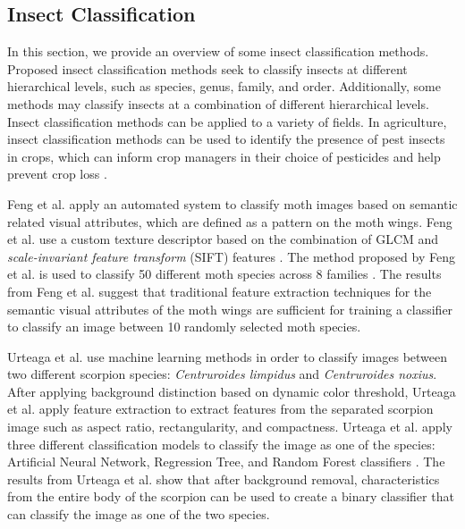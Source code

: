 \documentclass{aci}
\numberwithin{equation}{section}
\begin{document}
\subsection{Insect Classification}
In this section, we provide an overview of some insect classification methods.
Proposed insect classification methods seek to classify insects at different
hierarchical levels, such as species, genus, family, and order. Additionally,
some methods may classify insects at a combination of different hierarchical
levels. Insect classification methods can be applied to a variety of fields. In
agriculture, insect classification methods can be used to identify the presence
of pest insects in crops, which can inform crop managers in their choice of
pesticides and help prevent crop loss \cite{liu_pestnet_2019,
    kasinathan_machine_2021}.

Feng et al. \cite{feng_automated_2013} apply an automated system to classify
moth images based on semantic related visual attributes, which are defined as a
pattern on the moth wings. Feng et al. \cite{feng_automated_2013} use a custom
texture descriptor based on the combination of GLCM and \textit{scale-invariant
    feature transform} (SIFT) features \cite{gotlieb_texture_1990,
    lowe_distinctive_2004}. The method proposed by Feng et al.
\cite{feng_automated_2013} is used to classify 50 different moth species across
8 families \cite{feng_automated_2013}. The results from Feng et al.
\cite{feng_automated_2013} suggest that traditional feature extraction
techniques for the semantic visual attributes of the moth wings are sufficient
for training a classifier to classify an image between 10 randomly selected moth
species.

Urteaga et al. \cite{urteaga_scorpions_2016} use machine learning methods in
order to classify images between two different scorpion species:
\textit{Centruroides limpidus} and \textit{Centruroides noxius}. After applying
background distinction based on dynamic color threshold, Urteaga et al.
\cite{urteaga_scorpions_2016} apply feature extraction to extract features from
the separated scorpion image such as aspect ratio, rectangularity, and
compactness. Urteaga et al. \cite{urteaga_scorpions_2016} apply three different
classification models to classify the image as one of the species: Artificial
Neural Network, Regression Tree, and Random Forest classifiers
\cite{urteaga_scorpions_2016}. The results from Urteaga et al.
\cite{urteaga_scorpions_2016} show that after background removal,
characteristics from the entire body of the scorpion can be used to create a
binary classifier that can classify the image as one of the two species.
\end{document}
